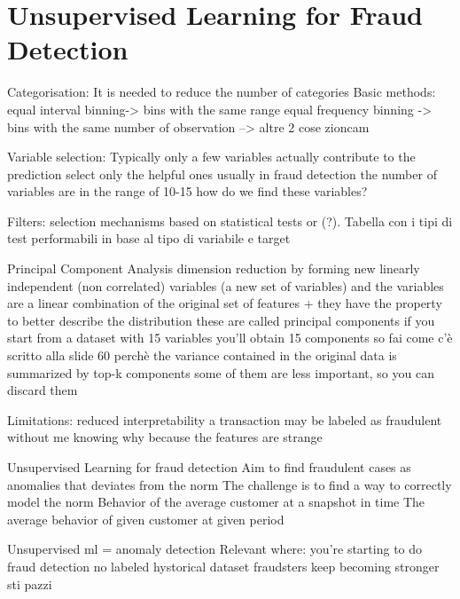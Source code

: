 \section{Unsupervised Learning for Fraud Detection}
\iffalse
        Categorisation:
            It is needed to reduce the number of categories 
            Basic methods:
                equal interval binning-> bins with the same range
                equal frequency binning -> bins with the same number of observation
                --> altre 2 cose zioncam
        
        Variable selection:
            Typically only a few variables actually contribute to the prediction
            select only the helpful ones 
            usually in fraud detection the number of variables are in the range of 10-15
            how do we find these variables?
        
            Filters:
                selection mechanisms based on statistical tests or (?).
                Tabella con i tipi di test performabili in base al tipo di variabile e target 

            Principal Component Analysis 
                dimension reduction by forming new linearly independent (non correlated) variables (a new set of variables)
                and the variables are a linear combination of the original set of features 
                + they have the property to better describe the distribution 
                these are called principal components 
                if you start from a dataset with 15 variables you'll obtain 15 components 
                so fai come c'è scritto alla slide 60
                perchè the variance contained in the original data is summarized by top-k components 
                some of them are less important, so you can discard them 

                Limitations:
                    reduced interpretability 
                        a transaction may be labeled as fraudulent without me knowing why because the features are strange 

Unsupervised Learning for fraud detection 
    Aim to find fraudulent cases as anomalies that deviates from the norm 
    The challenge is to find a way to correctly model the norm 
        Behavior of the average customer at a snapshot in time 
        The average behavior of given customer at given period
    
    Unsupervised ml = anomaly detection 
        Relevant where:
            you're starting to do fraud detection 
            no labeled hystorical dataset 
            fraudsters keep becoming stronger sti pazzi 

